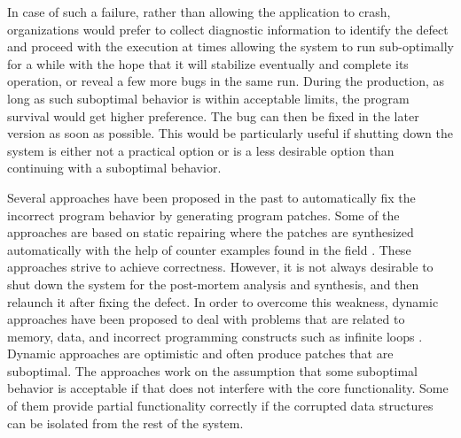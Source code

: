 In case of such a failure, rather than allowing the application to crash,
organizations would
prefer to collect diagnostic information to identify the defect and proceed with
the execution at times
allowing the system to run sub-optimally for a while with the hope that it will
stabilize eventually and complete its operation, or 
reveal a few more bugs in the same run. During the production, as long as such
suboptimal
behavior is within acceptable limits, the program survival would get higher
preference. The bug can then be
fixed in the later version as soon as possible. This would be particularly
useful if shutting down the system is
either not a practical option or is a less desirable option than continuing with
a suboptimal behavior.


Several approaches have been proposed in the past to automatically fix the
incorrect program behavior by generating program patches.
Some of the approaches are based on static repairing
where the patches are synthesized automatically with the help of counter
examples
found in the field \cite{wei-issta-2010}. These approaches strive to achieve
correctness.
However, it is not always desirable to shut down the system for the post-mortem
analysis and synthesis, and then relaunch it
after fixing the defect. In order to overcome this weakness,
dynamic approaches have been proposed to deal with problems that are
related to memory, data, and incorrect programming constructs such as infinite
loops \cite{Carbin:2011, KlingMCR12, conf/sosp/PerkinsKLABCPSSSWZER09}.
Dynamic approaches are optimistic and often produce patches that are suboptimal.
The approaches work on the
assumption that some suboptimal behavior is acceptable if that does not
interfere with the core functionality. Some of them provide
partial functionality correctly if the corrupted data structures can be isolated
from the rest of the system.

